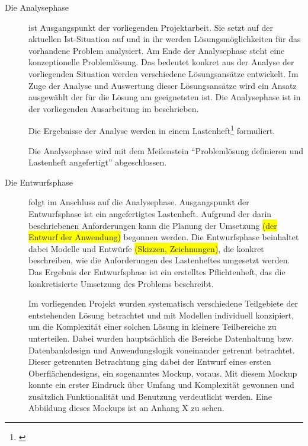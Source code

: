 \begin{description}

  \item[Die Analysephase] ist Ausgangspunkt der vorliegenden Projektarbeit. Sie setzt
  auf der aktuellen Ist-Situation auf und in ihr werden Lösungsmöglichkeiten für
  das vorhandene Problem analysiert. Am Ende der Analysephase steht eine
  konzeptionelle Problemlösung. Das bedeutet konkret aus der Analyse der
  vorliegenden Situation werden verschiedene Lösungsansätze entwickelt. Im
  Zuge der Analyse und Auswertung dieser Lösungsansätze wird ein Ansatz
  ausgewählt der für die Lösung am geeignetsten ist. Die Analysephase ist in
  der vorliegenden Ausarbeitung im  beschrieben.

  Die Ergebnisse der Analyse werden in einem Lastenheft\footnote{\citet{lastenheft2013}} formuliert.

  Die Analysephase wird mit dem Meilenstein "`Problemlösung definieren und
  Lastenheft angefertigt"' abgeschlossen. 


  \item[Die Entwurfsphase] folgt im Anschluss auf die Analysephase.
  Ausgangspunkt der Entwurfsphase ist ein angefertigtes Lastenheft. Aufgrund der
  darin beschriebenen Anforderungen kann die Planung der Umsetzung
  \colorbox{yellow}{(der Entwurf der Anwendung)} begonnen werden. Die
  Entwurfsphase beinhaltet dabei Modelle und Entwürfe
  \colorbox{yellow}{(Skizzen, Zeichnungen)}, die konkret beschreiben, wie die
  Anforderungen des Lastenheftes umgesetzt werden. Das Ergebnis der Entwurfsphase ist ein erstelltes Pflichtenheft, das die konkretisierte Umsetzung des Problems
  beschreibt.

  Im vorliegenden Projekt wurden systematisch verschiedene Teilgebiete der
  entstehenden Lösung betrachtet und mit Modellen individuell konzipiert, um die
  Komplexität einer solchen Lösung in kleinere Teilbereiche zu unterteilen. Dabei
  wurden hauptsächlich die Bereiche Datenhaltung bzw. Datenbankdesign und
  Anwendungslogik voneinander getrennt betrachtet. Dieser getrennten Betrachtung
  ging dabei der Entwurf eines ersten Oberflächendesigns, ein sogenanntes
  Mockup, voraus. Mit diesem Mockup konnte ein erster Eindruck über Umfang und
  Komplexität gewonnen und zusätzlich Funktionalität und Benutzung
  verdeutlicht werden. Eine Abbildung dieses Mockups ist an Anhang X zu sehen.


\end{description}
